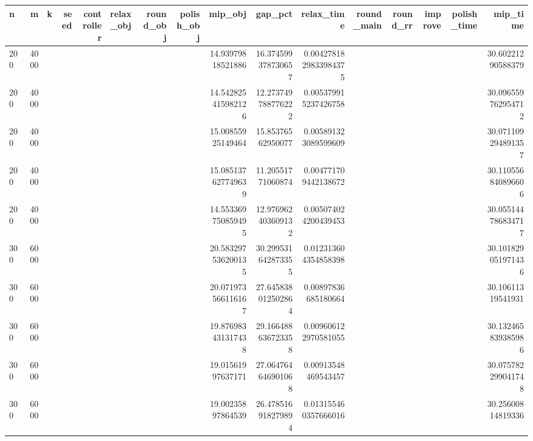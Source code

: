 \begin{tabular}{lrrrrlrrrrrrrrrr}
\hline
n & m & k & seed & controller & relax_obj & round_obj & polish_obj & mip_obj & gap_pct & relax_time & round_main & round_rr & improve & polish_time & mip_time \\ \hline
200 & 4000 &  &  &  &  &  &  & 14.93979818521886 & 16.374599378730657 & 0.0042781829833984375 &  &  &  &  & 30.60221290588379 \\
200 & 4000 &  &  &  &  &  &  & 14.542825415982126 & 12.273749788776222 & 0.005379915237426758 &  &  &  &  & 30.096559762954712 \\
200 & 4000 &  &  &  &  &  &  & 15.00855925149464 & 15.85376562950077 & 0.005891323089599609 &  &  &  &  & 30.071109294891357 \\
200 & 4000 &  &  &  &  &  &  & 15.085137627749639 & 11.20551771060874 & 0.004771709442138672 &  &  &  &  & 30.110556840896606 \\
200 & 4000 &  &  &  &  &  &  & 14.553369750859495 & 12.976962403609132 & 0.005074024200439453 &  &  &  &  & 30.055144786834717 \\
300 & 6000 &  &  &  &  &  &  & 20.583297536200135 & 30.299531642873355 & 0.012313604354858398 &  &  &  &  & 30.101829051971436 \\
300 & 6000 &  &  &  &  &  &  & 20.071973566116167 & 27.645838012502864 & 0.00897836685180664 &  &  &  &  & 30.10611319541931 \\
300 & 6000 &  &  &  &  &  &  & 19.876983431317438 & 29.166488636723358 & 0.009606122970581055 &  &  &  &  & 30.132465839385986 \\
300 & 6000 &  &  &  &  &  &  & 19.01561997637171 & 27.064764646901068 & 0.00913548469543457 &  &  &  &  & 30.075782299041748 \\
300 & 6000 &  &  &  &  &  &  & 19.00235897864539 & 26.478516918279894 & 0.013155460357666016 &  &  &  &  & 30.25600814819336 \\
\hline
\end{tabular}
